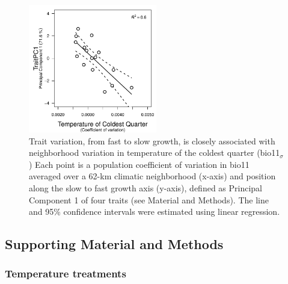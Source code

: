 \documentclass[11pt, oneside]{article}
\begin{document}

\begin{figure}[h!]
\centerline{\includegraphics[width=0.5\textwidth]{Figures/FigureS_bio11PC1.pdf}}
\fontsize{10}{12}
\selectfont
\caption[Trait PC1 versus bio11_cva_SA]{Trait variation, from fast to slow growth, is closely associated with neighborhood variation in temperature of the coldest quarter (bio11$_\sigma$) Each point is a population coefficient of variation in bio11 averaged over a 62-km climatic neighborhood  (x-axis) and position along the slow to fast growth axis (y-axis), defined as Principal Component 1 of four traits (see Material and Methods). The line and 95\% confidence intervals were estimated using linear regression.}
\label{fig:FigS_bio11PC1}
\end{figure}

\clearpage


\subsection*{Supporting Material and Methods}

\subsubsection*{Temperature treatments}
\end{document}
